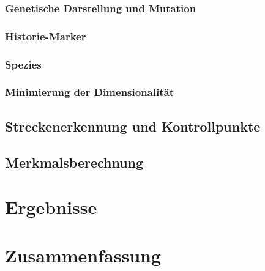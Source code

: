 \documentclass[11pt,final,journal,a4paper,towside,towcolumn]{IEEEtran}
\begin{document}
\subsubsection{Genetische Darstellung und Mutation}

\subsubsection{Historie-Marker}

\subsubsection{Spezies}

\subsubsection{Minimierung der Dimensionalität}

\subsection{Streckenerkennung und Kontrollpunkte}

\subsection{Merkmalsberechnung}

\section{Ergebnisse}

\section{Zusammenfassung}

{}

\end{document}
